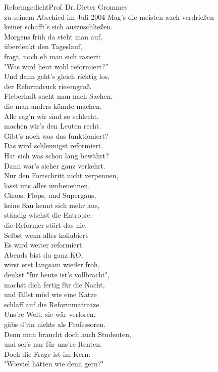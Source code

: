 \begin{lied*}{Reformgedicht}{Prof.\,Dr.\,Dieter Grommes\\zu seinem Abschied im Juli 2004}
Mag's die meisten auch verdrießen\\
keiner schafft's sich auszuschließen.\\
Morgens früh da steht man auf,\\
überdenkt den Tageslauf,\\
fragt, noch eh man sich rasiert:\\
"Was wird heut wohl reformiert?''\\

Und dann geht's gleich richtig los,\\
der Reformdruck riesengroß.\\
Fieberhaft sucht man nach Sachen,\\
die man anders könnte machen.\\
Alle sag'n wir sind so schlecht,\\
machen wir's den Leuten recht.\\
Gibt's noch was das funktioniert?\\
Das wird schleunigst reformiert.\\
Hat sich was schon lang bewährt?\\
Dann war's sicher ganz verkehrt.\\

Nur den Fortschritt nicht verpennen,\\
lasst uns alles umbenennen.\\
Chaos, Flops, und Supergaus,\\
keine Sau kennt sich mehr aus,\\
ständig wächst die Entropie,\\
die Reformer stört das nie.\\
Selbst wenn alles kollabiert\\
Es wird weiter reformiert.\\

Abends bist du ganz KO,\\
wirst erst langsam wieder froh,\\
denkst "für heute ist's vollbracht",\\
machst dich fertig für die Nacht,\\
und fällst müd wie eine Katze\\
schlaff auf die Reformmatratze.\\

Uns're Welt, sie wär verloren,\\
gäbs d'rin nichts als Professoren.\\
Denn man braucht doch auch Studenten,\\
und sei's nur für uns're Renten.\\
Doch die Frage ist im Kern:\\
"Wieviel hätten wie denn gern?"\\


\end{lied*}
